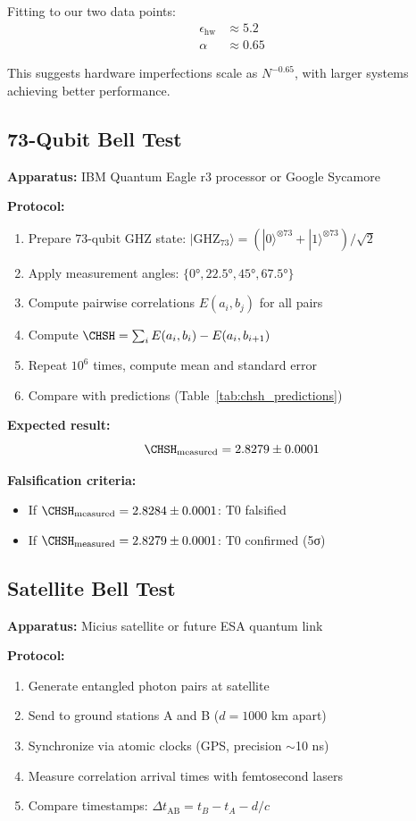 Fitting to our two data points:
\begin{align}
	\epsilon_{\text{hw}} &\approx 5.2 \\
	\alpha &\approx 0.65
\end{align}

This suggests hardware imperfections scale as $N^{-0.65}$, with larger systems achieving better performance.

\subsection{73-Qubit Bell Test}

\textbf{Apparatus:} IBM Quantum Eagle r3 processor or Google Sycamore

\textbf{Protocol:}
\begin{enumerate}
	\item Prepare 73-qubit GHZ state: $|\text{GHZ}_{73}\rangle = (|0\rangle^{\otimes 73} + |1\rangle^{\otimes 73})/\sqrt{2}$
	\item Apply measurement angles: $\{0°, 22.5°, 45°, 67.5°\}$
	\item Compute pairwise correlations $E(a_i, b_j)$ for all pairs
	\item Compute $\CHSH = \sum_i E(a_i, b_i) - E(a_i, b_{i+1})$
	\item Repeat $10^6$ times, compute mean and standard error
	\item Compare with predictions (Table~\ref{tab:chsh_predictions})
\end{enumerate}

\textbf{Expected result:}
\begin{equation}
	\CHSH_{\text{measured}} = 2.8279 \pm 0.0001
\end{equation}

\textbf{Falsification criteria:}
\begin{itemize}
	\item If $\CHSH_{\text{measured}} = 2.8284 \pm 0.0001$: T0 falsified
	\item If $\CHSH_{\text{measured}} = 2.8279 \pm 0.0001$: T0 confirmed (5σ)
\end{itemize}

\subsection{Satellite Bell Test}

\textbf{Apparatus:} Micius satellite or future ESA quantum link

\textbf{Protocol:}
\begin{enumerate}
	\item Generate entangled photon pairs at satellite
	\item Send to ground stations A and B ($d = 1000$ km apart)
	\item Synchronize via atomic clocks (GPS, precision $\sim$10 ns)
	\item Measure correlation arrival times with femtosecond lasers
	\item Compare timestamps: $\Delta t_{\text{AB}} = t_B - t_A - d/c$
\end{enumerate}

